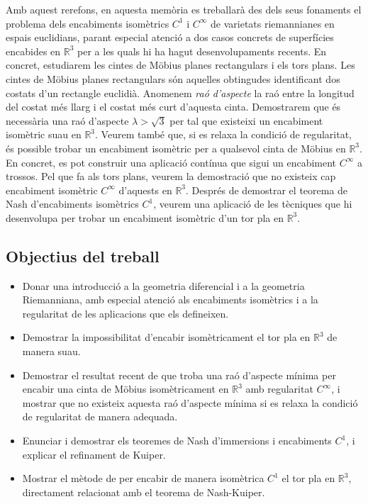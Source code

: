 Amb aquest rerefons, en aquesta memòria es treballarà des dels seus fonaments el problema dels encabiments isomètrics $C^1$ i $C^\infty$ de varietats riemannianes en espais euclidians, parant especial atenció a dos casos concrets de superfícies encabides en $\mathbb R^3$ per a les quals hi ha hagut desenvolupaments recents. En concret, estudiarem les cintes de Möbius planes rectangulars i els tors plans. Les cintes de Möbius planes rectangulars són aquelles obtingudes identificant dos costats d'un rectangle euclidià. Anomenem \textit{raó d'aspecte} la raó entre la longitud del costat més llarg i el costat més curt d'aquesta cinta. Demostrarem que és necessària una raó d'aspecte $\lambda>\sqrt3$ per tal que existeixi un encabiment isomètric suau en $\mathbb R^3$. 
Veurem també que, si es relaxa la condició de regularitat, és possible trobar un encabiment isomètric per a qualsevol cinta de Möbius en $\mathbb R^3$. En concret, es pot construir una aplicació contínua que sigui un encabiment $C^\infty$ a trossos. Pel que fa als tors plans, veurem la demostració que no existeix cap encabiment isomètric $C^\infty$ d'aquests en $\mathbb R^3$. Després de demostrar el teorema de Nash d'encabiments isomètrics $C^1$, veurem una aplicació de les tècniques que hi desenvolupa per trobar un encabiment isomètric d'un tor pla en $\mathbb R^3$.

\subsection*{Objectius del treball}
\begin{itemize}
    \item Donar una introducció a la geometria diferencial i a la geometria Riemanniana, amb especial atenció als encabiments isomètrics i a la regularitat de les aplicacions que els defineixen.
    \item Demostrar la impossibilitat d'encabir isomètricament el tor pla en $\mathbb R^3$ de manera suau.
    \item Demostrar el resultat recent de \citet{schwartz2024} que troba una raó d'aspecte mínima per encabir una cinta de Möbius isomètricament en $\mathbb R^3$ amb regularitat $C^\infty$, i mostrar que no existeix aquesta raó d'aspecte mínima si es relaxa la condició de regularitat de manera adequada.
    \item Enunciar i demostrar els teoremes de Nash d'immersions i encabiments $C^1$, i explicar el refinament de Kuiper.
    \item Mostrar el mètode de \citet{borrelli2013} per encabir de manera isomètrica $C^1$ el tor pla en $\mathbb R^3$, directament relacionat amb el teorema de Nash-Kuiper. 
\end{itemize}

